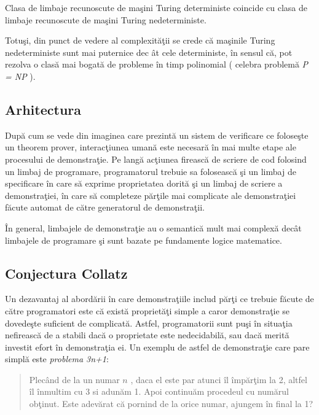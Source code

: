 \begin{theorem}
Clasa de limbaje recunoscute de ma\c sini Turing deterministe coincide cu clasa de limbaje recunoscute de ma\c sini Turing nedeterministe.
\end{theorem}

Totu\c si, din punct de vedere al complexit\u a\c tii se crede c\u a ma\c sinile Turing nedeterministe sunt mai puternice dec \^ at cele deterministe,  \^ in sensul c\u a, pot rezolva o clas\u a mai bogat\u a de probleme  \^ in timp polinomial ( celebra problem\u a \emph{P = NP} ).

\subsection{Arhitectura}

\done{}
Dup\u a cum se vede din imaginea care prezint\u a un sistem de verificare ce folose\c ste un theorem prover, interac\c tiunea uman\u a este necesar\u a  \^ in mai multe etape ale procesului de demonstra\c tie. Pe lang\u a ac\c tiunea fireasc\u a de scriere de cod folosind un limbaj de programare, programatorul trebuie sa foloseasc\u a \c si un limbaj de specificare  \^ in care s\u a exprime proprietatea dorit\u a \c si un limbaj de scriere a demonstra\c tiei,  \^ in care s\u a completeze p\u ar\c tile mai complicate ale demonstra\c tiei f\u acute automat de c\u atre generatorul de demonstra\c tii.

\^ In general, limbajele de demonstra\c tie au o semantic\u a mult mai complex\u a dec\^ at limbajele de programare \c si sunt bazate pe fundamente logice matematice.

\begin{center}
    
    \label{thm_prover_arch}
\end{center}

\subsection{Conjectura Collatz}

Un dezavantaj al abord\u arii  \^ in care demonstra\c tiile includ p\u ar\c ti ce trebuie f\u acute de c\u atre programatori este c\u a exist\u a propriet\u a\c ti simple a caror demonstra\c tie se dovede\c ste suficient de complicat\u a. Astfel, programatorii sunt pu\c si  \^ in situa\c tia nefireasc\u a de a stabili dac\u a o proprietate este nedecidabil\u a, sau dac\u a merit\u a investit efort  \^ in demonstra\c tia ei. Un exemplu de astfel de demonstra\c tie care pare simpl\u a este \emph{problema 3n+1}:
\begin{quote}
    Plec\^ and de la un numar $n$ , daca el este par atunci \^il \^imp\u ar\c tim la 2, altfel \^il \^inmultim cu 3 si adun\u am 1. Apoi continu\u am procedeul cu num\u arul ob\c tinut. Este adev\u arat c\u a pornind de la orice numar, ajungem \^in final la 1?
\end{quote}

